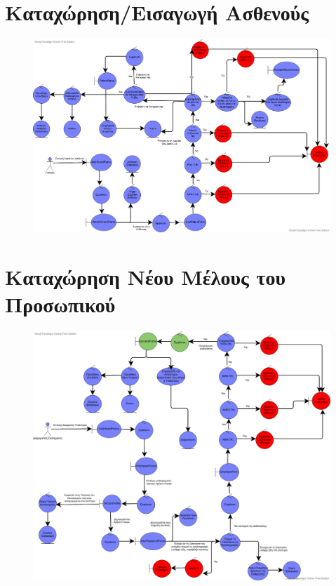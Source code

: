 \documentclass{article}
\begin{document}
\newpage

\section{Καταχώρηση/Εισαγωγή Ασθενούς}

\vspace{0.2cm}

\begin{figure}[!htb]
        \centering
        \includegraphics[width=1\textwidth]{Patient Insertion.png}
\end{figure}

\newpage

\section{Καταχώρηση Νέου Μέλους του Προσωπικού}

\vspace{0.2cm}

\begin{figure}[!htb]
        \centering
        \includegraphics[width=1\textwidth]{Employee Insertion.png}
\end{figure}
\end{document}
